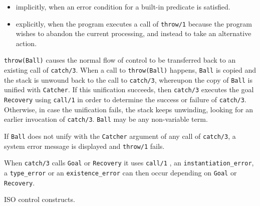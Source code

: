 \begin{itemize}

\item implicitly, when an error condition for a built-in predicate is
satisfied.

\item explicitly, when the program executes a call of \texttt{throw/1}
because the program wishes to abandon the current processing, and instead to
take an alternative action.

\end{itemize}

\texttt{throw(Ball)} causes the normal flow of control to be transferred
back to an existing call of \texttt{catch/3}. When a call to
\texttt{throw(Ball)} happens, \texttt{Ball} is copied and the stack is
unwound back to the call to \texttt{catch/3}, whereupon the copy of
\texttt{Ball} is unified with \texttt{Catcher}. If this unification
succeeds, then \texttt{catch/3} executes the goal \texttt{Recovery} using
\texttt{call/1}  in order to determine the success or
failure of \texttt{catch/3}. Otherwise, in case the unification fails,
the stack keeps unwinding, looking for an earlier invocation of
\texttt{catch/3}. \texttt{Ball} may be any non-variable term.

\begin{PlErrors}


\end{PlErrors}

If \texttt{Ball} does not unify with the \texttt{Catcher} argument of
any call of \texttt{catch/3}, a system error message is displayed and
\texttt{throw/1} fails.

When \texttt{catch/3} calls \texttt{Goal} or \texttt{Recovery} it uses \texttt{call/1}
, an \texttt{instantiation\_error}, a \texttt{type\_error}
or an \texttt{existence\_error} can then occur depending on
\texttt{Goal} or \texttt{Recovery}.

\Portability

ISO control constructs.


